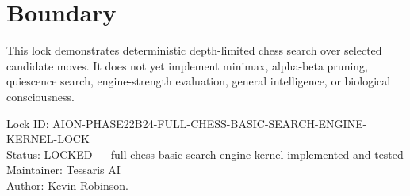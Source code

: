 \documentclass[11pt,a4paper]{article}
\begin{document}
\section{Boundary}

This lock demonstrates deterministic depth-limited chess search over selected candidate moves. It does not yet implement minimax, alpha-beta pruning, quiescence search, engine-strength evaluation, general intelligence, or biological consciousness.

\bigskip

\noindent
Lock ID: AION-PHASE22B24-FULL-CHESS-BASIC-SEARCH-ENGINE-KERNEL-LOCK\\
Status: LOCKED --- full chess basic search engine kernel implemented and tested\\
Maintainer: Tessaris AI\\
Author: Kevin Robinson.
\end{document}
